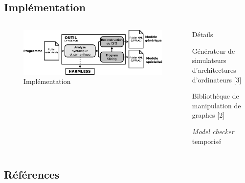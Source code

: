\documentclass[final]{beamer}
\begin{document}
\begin{frame}
    \section{Implémentation}

    \begin{columns}[t]
      \begin{column}{.66\linewidth}
        \begin{figure}
          \centering
          \includegraphics{img/archi.eps}
          \caption{Implémentation}
          \label{fig:tool}
        \end{figure}
      \end{column}
      \begin{column}{.33\linewidth}
        \begin{block}{Détails}
          \begin{description}[HARMLESS]
            \item[HARMLESS] Générateur de simulateurs d'architectures d'ordinateurs {\color{jdocgreen1}[3]}
            \item[LEMON] Bibliothèque de manipulation de graphes {\color{jdocgreen1}[2]}
            \item[UPPAAL] \emph{Model checker} temporisé
          \end{description}
        \end{block}
      \end{column}
    \end{columns}

    
    
      \subsection{Références}
      

\end{frame}
\end{document}

